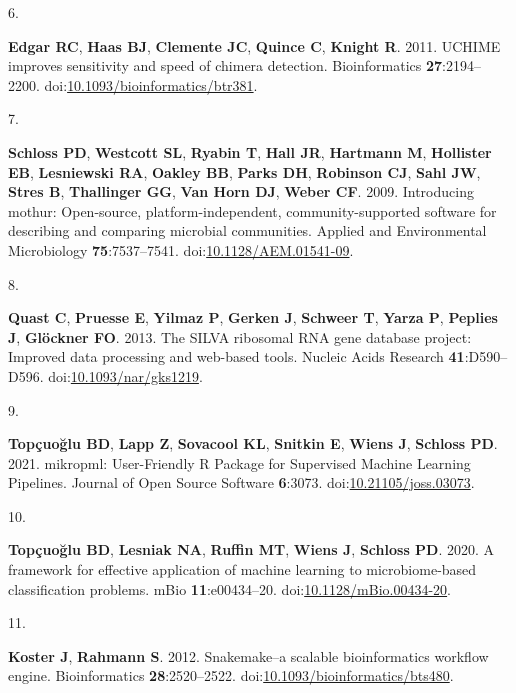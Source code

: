 \documentclass[
]{article}
\newlength{\cslhangindent}
\newlength{\csllabelwidth}
\newlength{\cslentryspacingunit} %
\newenvironment{CSLReferences}[2] %
 {%
  \setlength{\parindent}{0pt}
  \ifodd #1
  \let\oldpar\par
  \def\par{\hangindent=\cslhangindent\oldpar}
  \fi
  \setlength{\parskip}{#2\cslentryspacingunit}
 }%
 {}
\newcommand{\CSLLeftMargin}[1]{\parbox[t]{\csllabelwidth}{#1}}
\newcommand{\CSLRightInline}[1]{\parbox[t]{\linewidth - \csllabelwidth}{#1}\break}
\begin{document}
\begin{CSLReferences}{0}{1}
\leavevmode{}%
\CSLLeftMargin{6. }%
\CSLRightInline{\textbf{Edgar RC}, \textbf{Haas BJ}, \textbf{Clemente
JC}, \textbf{Quince C}, \textbf{Knight R}. 2011. UCHIME improves
sensitivity and speed of chimera detection. Bioinformatics
\textbf{27}:2194--2200.
doi:\href{https://doi.org/10.1093/bioinformatics/btr381}{10.1093/bioinformatics/btr381}.}

\leavevmode{}%
\CSLLeftMargin{7. }%
\CSLRightInline{\textbf{Schloss PD}, \textbf{Westcott SL},
\textbf{Ryabin T}, \textbf{Hall JR}, \textbf{Hartmann M},
\textbf{Hollister EB}, \textbf{Lesniewski RA}, \textbf{Oakley BB},
\textbf{Parks DH}, \textbf{Robinson CJ}, \textbf{Sahl JW}, \textbf{Stres
B}, \textbf{Thallinger GG}, \textbf{Van Horn DJ}, \textbf{Weber CF}.
2009. Introducing mothur: Open-source, platform-independent,
community-supported software for describing and comparing microbial
communities. Applied and Environmental Microbiology
\textbf{75}:7537--7541.
doi:\href{https://doi.org/10.1128/AEM.01541-09}{10.1128/AEM.01541-09}.}

\leavevmode{}%
\CSLLeftMargin{8. }%
\CSLRightInline{\textbf{Quast C}, \textbf{Pruesse E}, \textbf{Yilmaz P},
\textbf{Gerken J}, \textbf{Schweer T}, \textbf{Yarza P}, \textbf{Peplies
J}, \textbf{Glöckner FO}. 2013. The SILVA ribosomal RNA gene database
project: Improved data processing and web-based tools. Nucleic Acids
Research \textbf{41}:D590--D596.
doi:\href{https://doi.org/10.1093/nar/gks1219}{10.1093/nar/gks1219}.}

\leavevmode{}%
\CSLLeftMargin{9. }%
\CSLRightInline{\textbf{Topçuoğlu BD}, \textbf{Lapp Z}, \textbf{Sovacool
KL}, \textbf{Snitkin E}, \textbf{Wiens J}, \textbf{Schloss PD}. 2021.
mikropml: User-Friendly R Package for Supervised Machine Learning
Pipelines. Journal of Open Source Software \textbf{6}:3073.
doi:\href{https://doi.org/10.21105/joss.03073}{10.21105/joss.03073}.}

\leavevmode{}%
\CSLLeftMargin{10. }%
\CSLRightInline{\textbf{Topçuoğlu BD}, \textbf{Lesniak NA},
\textbf{Ruffin MT}, \textbf{Wiens J}, \textbf{Schloss PD}. 2020. A
framework for effective application of machine learning to
microbiome-based classification problems. mBio \textbf{11}:e00434--20.
doi:\href{https://doi.org/10.1128/mBio.00434-20}{10.1128/mBio.00434-20}.}

\leavevmode{}%
\CSLLeftMargin{11. }%
\CSLRightInline{\textbf{Koster J}, \textbf{Rahmann S}. 2012.
Snakemake--a scalable bioinformatics workflow engine. Bioinformatics
\textbf{28}:2520--2522.
doi:\href{https://doi.org/10.1093/bioinformatics/bts480}{10.1093/bioinformatics/bts480}.}


\end{CSLReferences}
\end{document}
